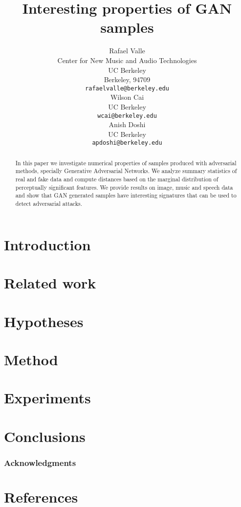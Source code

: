 \documentclass{article}
\title{Interesting properties of GAN samples}
\author{
  Rafael Valle \\
  Center for New Music and Audio Technologies \\
  UC Berkeley \\
  Berkeley, 94709 \\
  \texttt{rafaelvalle@berkeley.edu} \\
  \And
  Wilson Cai\\
  UC Berkeley\\
  \texttt{wcai@berkeley.edu} \\
  \And
  Anish Doshi\\
  UC Berkeley\\
  \texttt{apdoshi@berkeley.edu} \\
}
\begin{document}

\maketitle

\begin{abstract}
    In this paper we investigate numerical properties of samples produced 
    with adversarial methods, specially Generative Adversarial Networks. We analyze summary
    statistics of real and fake data and compute distances based on the 
    marginal distribution of perceptually significant features. We provide results 
    on image, music and speech data and show that GAN generated samples have 
    interesting signatures that can be used to detect adversarial attacks.
\end{abstract}

\theoremseparator{:}
\newtheorem{hyp}{Hypothesis}

\section{Introduction} \label{sec:introduction}

%
\section{Related work}\label{sec:related_work}

%
\section{Hypotheses}\label{sec:hypotheses}


\section{Method}\label{sec:method}

%
\section{Experiments}\label{sec:experiments}

%
\section{Conclusions}\label{sec:conclusions}

%

\subsubsection*{Acknowledgments}


\section*{References}


\end{document}
